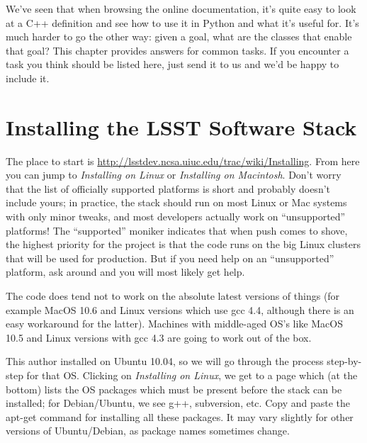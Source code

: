 \documentclass{book}
\begin{document}
We've seen that when browsing the online documentation, it's quite
easy to look at a C++ definition and see how to use it in Python and
what it's useful for.  It's much harder to go the other way: given a
goal, what are the classes that enable that goal?  This chapter
provides answers for common tasks. If you encounter a task you think
should be listed here, just send it to us and we'd be happy to include
it.

%
% 
%

\appendix

\chapter{Installing the LSST Software
  Stack\label{appendix-stackinstall}}


The place to start is
\url{http://lsstdev.ncsa.uiuc.edu/trac/wiki/Installing}.  From here
you can jump to {\it Installing on Linux} or {\it Installing on
  Macintosh}.  Don't worry that the list of officially supported
platforms is short and probably doesn't include yours; in practice,
the stack should run on most Linux or Mac systems with only minor
tweaks, and most developers actually work on ``unsupported''
platforms!  The ``supported'' moniker indicates that when push comes
to shove, the highest priority for the project is that the code runs
on the big Linux clusters that will be used for production.  But if
you need help on an ``unsupported'' platform, ask around and you will
most likely get help.

The code does tend not to work on the absolute latest versions of
things (for example MacOS 10.6 and Linux versions which use gcc 4.4,
although there is an easy workaround for the latter).  Machines with
middle-aged OS's like MacOS 10.5 and Linux versions with gcc 4.3 are
going to work out of the box.

This author installed on Ubuntu 10.04, so we will go through the
process step-by-step for that OS.  Clicking on {\it Installing on
  Linux}, we get to a page which (at the bottom) lists the OS packages
which must be present before the stack can be installed; for
Debian/Ubuntu, we see g++, subversion, etc.  Copy and paste the
apt-get command for installing all these packages. It may vary
slightly for other versions of Ubuntu/Debian, as package names
sometimes change.
\end{document}
